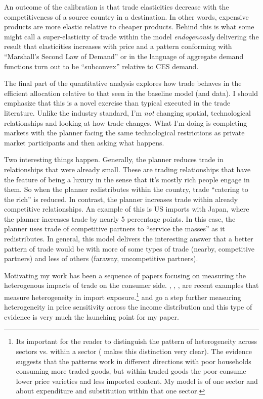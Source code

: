 \documentclass[12pt,pdftex]{article}
\begin{document}
\begin{onehalfspacing}
An outcome of the calibration is that trade elasticities decrease with the competitiveness of a source country in a destination. In other words, expensive products are more elastic relative to cheaper products. Behind this is what some might call a super-elasticity of trade within the model \emph{endogenously} delivering the result that elasticities increases with price and a pattern conforming with ``Marshall's Second Law of Demand'' or in the language of \citet{mrazova2017not} aggregate demand functions turn out to be ``subconvex'' relative to CES demand.

The final part of the quantitative analysis explores how trade behaves in the efficient allocation relative to that seen in the baseline model (and data). I should emphasize that this is a novel exercise than typical executed in the trade literature. Unlike the industry standard, I'm \emph{not} changing spatial, technological relationships and looking at how trade changes. What I'm doing is completing markets with the planner facing the same technological restrictions as private market participants and then asking what happens.

Two interesting things happen. Generally, the planner reduces trade in relationships that were already small. These are trading relationships that have the feature of being a luxury in the sense that it's mostly rich people engage in them. So when the planner redistributes within the country, trade ``catering to the rich'' is reduced. In contrast, the planner increases trade within already competitive relationships. An example of this is US imports with Japan, where the planner increases trade by nearly 5 percentage points. In this case, the planner uses trade of competitive partners to ``service the masses'' as it redistributes. In general, this model delivers the interesting answer that a better pattern of trade would be with more of some types of trade (nearby, competitive partners) and less of others (faraway, uncompetitive partners).

Motivating my work has been a sequence of papers focusing on measuring the heterogenous impacts of trade on the consumer side. \citet{fajgelbaum2016measuring}, \citet{carroll2020heterogeneous}, \citet{borusyak2021distributional}, \citet{jaccardtoronto} are recent examples that measure heterogeneity in import exposure.\footnote{Its important for the reader to distinguish the pattern of heterogeneity across sectors vs. within a sector (\citet{cravino2017distributional} makes this distinction very clear). The evidence suggests that the patterns work in different directions with poor households consuming more traded goods, but within traded goods the poor consume lower price varieties and less imported content. My model is of one sector and about expenditure and substitution within that one sector.} \citet*{auer2022unequal} and \citet*{colicev2022impact} go a step further measuring heterogeneity in price sensitivity across the income distribution and this type of evidence is very much the launching point for my paper.


\end{onehalfspacing}
\end{document}
